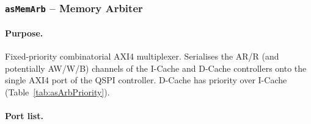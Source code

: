 \subsubsection{\texttt{asMemArb} -- Memory Arbiter}
\label{subsubsec:asMemArb}

\paragraph{Purpose.}
Fixed-priority combinatorial AXI4 multiplexer.
Serialises the AR/R (and potentially AW/W/B) channels of the I-Cache
and D-Cache controllers onto the single AXI4 port of the QSPI
controller.
D-Cache has priority over I-Cache (Table~\ref{tab:asArbPriority}).

\paragraph{Port list.}

